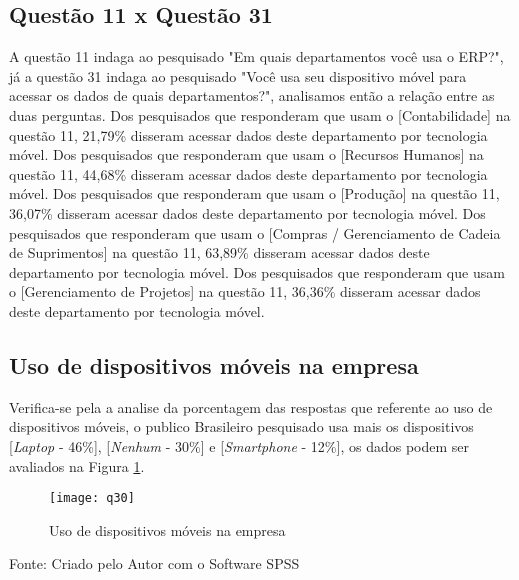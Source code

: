\subsection{Questão 11 x Questão 31}

A questão 11 indaga ao pesquisado "Em quais departamentos você usa o ERP?", já a questão 31 indaga ao pesquisado "Você usa seu dispositivo móvel para acessar os dados de quais departamentos?", analisamos então a relação entre as duas perguntas.\newline
\indent Dos pesquisados que responderam que usam o [Contabilidade] na questão 11, 21,79\% disseram acessar dados deste departamento por tecnologia móvel.\newline
\indent Dos pesquisados que responderam que usam o [Recursos Humanos] na questão 11, 44,68\% disseram acessar dados deste departamento por tecnologia móvel.\newline
\indent Dos pesquisados que responderam que usam o [Produção] na questão 11, 36,07\% disseram acessar dados deste departamento por tecnologia móvel.\newline
\indent Dos pesquisados que responderam que usam o [Compras / Gerenciamento de Cadeia de Suprimentos] na questão 11, 63,89\% disseram acessar dados deste departamento por tecnologia móvel.\newline
\indent Dos pesquisados que responderam que usam o [Gerenciamento de Projetos] na questão 11, 36,36\% disseram acessar dados deste departamento por tecnologia móvel.

\subsection{Uso de dispositivos móveis na empresa}

Verifica-se pela a analise da porcentagem das respostas que referente ao uso de dispositivos móveis, o publico Brasileiro pesquisado usa mais os dispositivos [\textit{Laptop} - 46\%], [\textit{Nenhum} - 30\%] e [\textit{Smartphone} - 12\%], os dados podem ser avaliados na Figura \ref{fig:figura-q30}.

\begin{figure}[H]
	\centering	
	\caption{Uso de dispositivos móveis na empresa}
	\texttt{[image: q30]}
	\label{fig:figura-q30}
\end{figure}
\vspace{-0.8 cm} \hspace{3.15 cm} Fonte: Criado pelo Autor com o Software SPSS\newline

